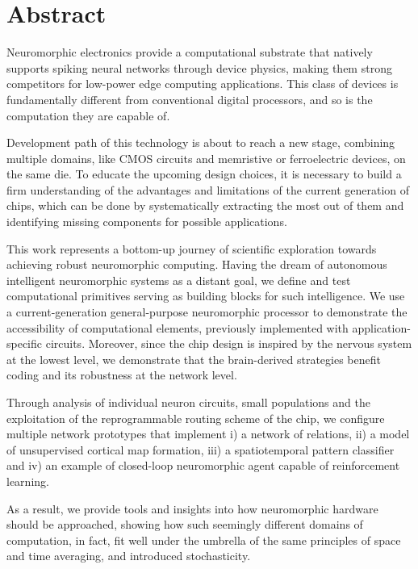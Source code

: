 
\chapter*{Abstract}

Neuromorphic electronics provide a computational substrate that natively supports spiking neural networks through device physics, making them strong competitors for low-power edge computing applications. This class of devices is fundamentally different from conventional digital processors, and so is the computation they are capable of.

Development path of this technology is about to reach a new stage, combining multiple domains, like CMOS circuits and memristive or ferroelectric devices, on the same die. To educate the upcoming design choices, it is necessary to build a firm understanding of the advantages and limitations of the current generation of chips, which can be done by systematically extracting the most out of them and identifying missing components for possible applications.

This work represents a bottom-up journey of scientific exploration towards achieving robust neuromorphic computing. Having the dream of autonomous intelligent neuromorphic systems as a distant goal, we define and test computational primitives serving as building blocks for such intelligence. We use a current-generation general-purpose neuromorphic processor to demonstrate the accessibility of computational elements, previously implemented with application-specific circuits. Moreover, since the chip design is inspired by the nervous system at the lowest level, we demonstrate that the brain-derived strategies benefit coding and its robustness at the network level.

Through analysis of individual neuron circuits, small populations and the exploitation of the reprogrammable routing scheme of the chip, we configure multiple network prototypes that implement i) a network of relations, ii) a model of unsupervised cortical map formation, iii) a spatiotemporal pattern classifier and iv) an example of closed-loop neuromorphic agent capable of reinforcement learning.

As a result, we provide tools and insights into how neuromorphic hardware should be approached, showing how such seemingly different domains of computation, in fact, fit well under the umbrella of the same principles of space and time averaging, and introduced stochasticity.


